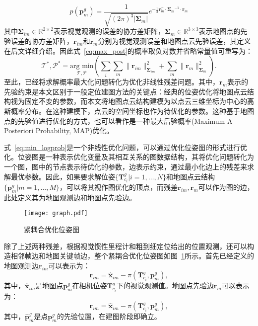 \begin{equation}
  p(\symbf{p}_m^g) = \frac{1}{\sqrt{(2\pi)^3|\symbf{\Sigma}_m|}}e^{-\frac{1}{2}\symbf{r}_{m}^T \cdot {\symbf{\Sigma}_{m}}^{-1} \cdot \symbf{r}_{m}}
\end{equation}
其中$\symbf{\Sigma}_{im}\in \mathbb{R}^{2\times 2}$表示视觉观测的误差的协方差矩阵，$\symbf{\Sigma}_{m} \in \mathbb{R}^{3 \times 3}$表示地图点的先验误差的协方差矩阵，$\symbf{r}_{im}$和$\symbf{r}_m$分别为视觉观测误差和地图点云先验误差，其定义在后文详细介绍。因此式~\eqref{eq:max_post}的概率取负对数并省略常量值可重写为：
\begin{equation}
\label{eq:min_logprob}
\mathcal{T}^*, \mathcal{P}^* = \underset{\mathcal{T}, \mathcal{P}}{\text{arg min}} \left( \sum_i \sum_m \| \symbf{r}_{im} \|_{\symbf{\Sigma}_{im}}^2 + \sum_m \| \symbf{r}_m \|_{\symbf{\Sigma}_{m}}^2 \right).
\end{equation}
至此，已经将求解概率最大化问题转化为优化非线性残差问题。其中，$\symbf{r}_{m}$表示的先验约束是本文区别于一般定位建图方法的关键点：经典的位姿优化将地图点云结构视为固定不变的参数，而本文将地图点云结构建模为以点云三维坐标为中心的高斯概率分布。在这种建模下，点云的空间坐标也作为待优化的参数。这种基于地图点的先验值进行优化的方式，也可以看作是一种最大后验概率(Maximum A Posteriori Probability, MAP)优化。

式~\eqref{eq:min_logprob}是一个非线性优化问题，可以通过优化位姿图的形式进行优化。位姿图是一种表示优化变量及其相互关系的图数据结构，其将优化问题转化为一个图，图中的节点表示待优化的参数，边表示约束，通过最小化边上的残差来求解最优参数。因此，如果要求解位姿$\{ \symbf{T}_{c_i}^g | i=1,\dots, N\}$和地图点云结构$\{\symbf{p}^g_m | m = 1, \dots, M\}$，可以将其视作图优化的顶点，而残差$\symbf{r}_{im}, \symbf{r}_m$可以作为图的边，此处定义其为地图观测边和地图点先验边。

\begin{figure}
  \centering
  \texttt{[image: graph.pdf]}
  \caption{紧耦合优化位姿图}
  \label{fig:graph}
\end{figure}

除了上述两种残差，根据视觉惯性里程计和粗到细定位给出的位置观测，还可以构造相邻帧边和地图关键帧边，整个紧耦合优化位姿图如图~\ref{fig:graph}所示。首先已经定义的地图观测边$\symbf{r}_{im}$可以表示为：
\begin{equation}
  \symbf{r}_{im} = \hat{\symbf{x}}_{im} - \pi(\symbf{T}_{c_{i}}^g, \symbf{p}^g_m),
\end{equation}
其中，$\hat{\symbf{x}}_{im}$是地图点$\symbf{p}^g_m$在相机位姿$\symbf{T}_{c_{i}}^g$下的视觉观测值。地图点先验边$\symbf{r}_m$可以表示为：
\begin{equation}
  \symbf{r}_{im} = \hat{\symbf{x}}_{im} - \pi(\symbf{T}_{c_{i}}^g, \symbf{p}^g_m),
\end{equation}
其中，$\hat{\symbf{p}}^g_m$是点$\symbf{p}^g_m$的先验位置，在建图阶段即确立。

